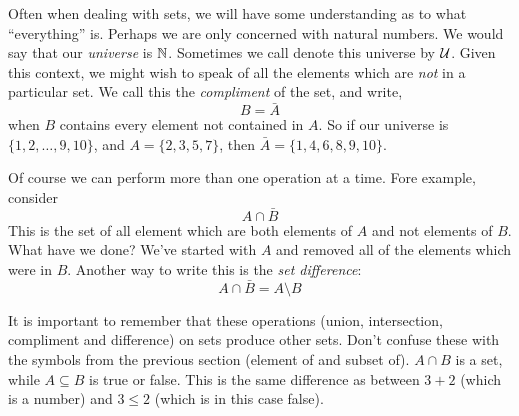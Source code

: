 \documentclass[12pt]{article}
\begin{document}
Often when dealing with sets, we will have some understanding as to what ``everything'' is.  Perhaps we are only concerned with natural numbers.  We would say that our {\em universe} is $\mathbb N$.  Sometimes we call denote this universe by $\mathcal U$.  Given this context, we might wish to speak of all the elements which are {\em not} in a particular set.  We call this the {\em compliment} of the set, and write,
\[ B = \bar A\]
when $B$ contains every element not contained in $A$.  So if our universe is $\{1, 2,\ldots, 9, 10\}$, and $A = \{2, 3, 5, 7\}$, then $\bar A = \{1, 4, 6, 8, 9,10\}$.

Of course we can perform more than one operation at a time.  Fore example, consider
\[A \cap \bar B\]
This is the set of all element which are both elements of $A$ and not elements of $B$.  What have we done?  We've started with $A$ and removed all of the elements which were in $B$.  Another way to write this is the {\em set difference}:
\[A \cap \bar B = A \setminus B\]

It is important to remember that these operations (union, intersection, compliment and difference) on sets produce other sets.  Don't confuse these with the symbols from the previous section (element of and subset of).  $A \cap B$ is a set, while $A \subseteq B$ is true or false.  This is the same difference as between $3 + 2$ (which is a number) and $3 \le 2$ (which is in this case false).
\end{document}
